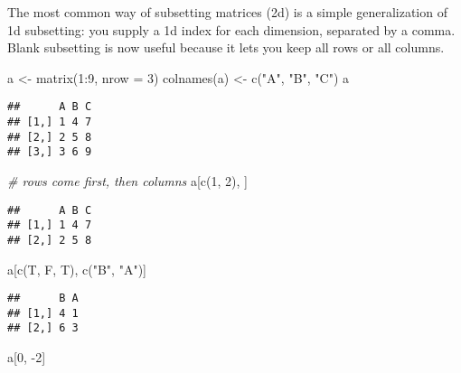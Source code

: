 \documentclass[
]{book}
\newenvironment{Shaded}{\begin{snugshade}}{\end{snugshade}}
\newcommand{\AttributeTok}[1]{\textcolor[rgb]{0.77,0.63,0.00}{#1}}
\newcommand{\CommentTok}[1]{\textcolor[rgb]{0.56,0.35,0.01}{\textit{#1}}}
\newcommand{\DecValTok}[1]{\textcolor[rgb]{0.00,0.00,0.81}{#1}}
\newcommand{\FunctionTok}[1]{\textcolor[rgb]{0.00,0.00,0.00}{#1}}
\newcommand{\NormalTok}[1]{#1}
\newcommand{\OtherTok}[1]{\textcolor[rgb]{0.56,0.35,0.01}{#1}}
\newcommand{\SpecialCharTok}[1]{\textcolor[rgb]{0.00,0.00,0.00}{#1}}
\newcommand{\StringTok}[1]{\textcolor[rgb]{0.31,0.60,0.02}{#1}}
\begin{document}
The most common way of subsetting matrices (2d) is a simple generalization of 1d subsetting: you supply a 1d index for each dimension, separated by a comma. Blank subsetting is now useful because it lets you keep all rows or all columns.

\begin{Shaded}
\begin{Highlighting}[]
\NormalTok{a }\OtherTok{\textless{}{-}} \FunctionTok{matrix}\NormalTok{(}\DecValTok{1}\SpecialCharTok{:}\DecValTok{9}\NormalTok{, }\AttributeTok{nrow =} \DecValTok{3}\NormalTok{)}
\FunctionTok{colnames}\NormalTok{(a) }\OtherTok{\textless{}{-}} \FunctionTok{c}\NormalTok{(}\StringTok{"A"}\NormalTok{, }\StringTok{"B"}\NormalTok{, }\StringTok{"C"}\NormalTok{)}
\NormalTok{a}
\end{Highlighting}
\end{Shaded}

\begin{verbatim}
##      A B C
## [1,] 1 4 7
## [2,] 2 5 8
## [3,] 3 6 9
\end{verbatim}

\begin{Shaded}
\begin{Highlighting}[]
\CommentTok{\# rows come first, then columns}
\NormalTok{a[}\FunctionTok{c}\NormalTok{(}\DecValTok{1}\NormalTok{, }\DecValTok{2}\NormalTok{), ]}
\end{Highlighting}
\end{Shaded}

\begin{verbatim}
##      A B C
## [1,] 1 4 7
## [2,] 2 5 8
\end{verbatim}

\begin{Shaded}
\begin{Highlighting}[]
\NormalTok{a[}\FunctionTok{c}\NormalTok{(T, F, T), }\FunctionTok{c}\NormalTok{(}\StringTok{"B"}\NormalTok{, }\StringTok{"A"}\NormalTok{)]}
\end{Highlighting}
\end{Shaded}

\begin{verbatim}
##      B A
## [1,] 4 1
## [2,] 6 3
\end{verbatim}

\begin{Shaded}
\begin{Highlighting}[]
\NormalTok{a[}\DecValTok{0}\NormalTok{, }\SpecialCharTok{{-}}\DecValTok{2}\NormalTok{]}
\end{Highlighting}
\end{Shaded}
\end{document}
